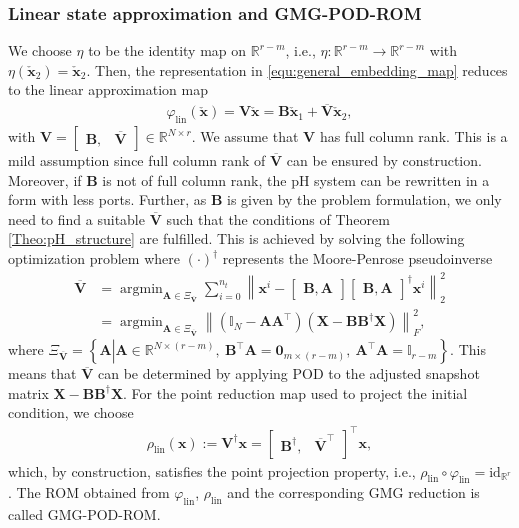 \documentclass{article}
\newcommand{\argmin}{ \mathop{ \mathrm{argmin} } }
\newcommand{\bmA}{\bm{A}}
\newcommand{\bmV}{\bm{V}}
\newcommand{\bmB}{\bm{B}}
\newcommand{\bmX}{\bm{X}}
\newcommand{\R}{\mathbb{R}}
\newcommand{\statex}{{\bm x}}
\newcommand{\stateRed}{\check{\bm x}}
\newcommand{\snapsize}{n_t}
\newcommand{\portsize}{m}
\newcommand{\FOMsize}{N}
\newcommand{\ROMsize}{r}
\newcommand{\Vbar}{\overline{\bmV}}
\newcommand{\approxfunc}{\varphi}
\newcommand{\VPODGMG}{\overline{\bmV}}
\newcommand{\pH}{\textsf{pH}\xspace}
\newcommand{\GMG}{\textsf{GMG}\xspace}
\newcommand{\POD}{\textsf{POD}\xspace}
\newcommand{\ROM}{\textsf{ROM}\xspace}
\begin{document}
\subsubsection{Linear state approximation and \GMG-\POD-\ROM} 
\label{Sec:GMGPODROM}
We choose $\eta$ to be the identity map on $\R^{r-m}$, i.e., $\eta: \R^{r-m} \rightarrow \R^{r-m}$ with $\eta(\stateRed_2)= \stateRed_2$. 
Then, the representation in \eqref{equ:general_embedding_map} reduces to the linear approximation map
								\begin{align}
									\label{equ:linear_approximation}
									\approxfunc_{\text{lin}}(\stateRed)=\bmV\stateRed =\bmB\stateRed_1+\VPODGMG\stateRed_2,
								\end{align}
								with $\bmV= 
								\begin{bmatrix}
									\bmB,&\VPODGMG
								\end{bmatrix}
\in \R^{\FOMsize \times \ROMsize}$. We assume that $\bmV$ has full column rank. This is a mild assumption since full column rank of $\VPODGMG$ can be ensured by construction. Moreover, if $\bmB$ is not of full column rank, the \pH system can be rewritten in a form with less ports. Further, as $\bmB$ is given by the problem formulation, we only need to find a suitable $\VPODGMG$ such that the conditions of Theorem \ref{Theo:pH_structure} are fulfilled. This is achieved by solving the following optimization problem where ${(\cdot)}^{\dagger}$ represents the Moore-Penrose pseudoinverse 
\begin{align*}
		\VPODGMG
		&=
		\argmin_{\bmA\in\Xi_{\VPODGMG}}
		\sum_{i=0}^{\snapsize}
		\left\| \statex^i-\begin{bmatrix}
			\bmB,\bmA
		\end{bmatrix}
		\begin{bmatrix}
			\bmB,\bmA
		\end{bmatrix}^{\dagger}\statex^i \right\|_2^2\\
		&=
		\argmin_{\bmA\in\Xi_{\VPODGMG}}
		\left\| 
		\left(\mathbb{I}_N-\bmA\bmA^{\top}\right)
		\left(\bmX-\bmB\bmB^{\dagger}\bmX\right)
		\right\|_F^2 ,
\end{align*}
where 
	$\Xi_{\VPODGMG} = \left\{\bmA\left|\right.\bmA\in\R^{\FOMsize\times(\ROMsize-\portsize)},
	\
	 \bmB^{\top} \bmA= \bm{0}_{\portsize \times (\ROMsize-\portsize)},
	 \
	 \bmA^{\top}\bmA=\mathbb{I}_{\ROMsize-\portsize}\right\}.$
This means that $\VPODGMG$ can be determined by applying \POD to the adjusted snapshot matrix $\bmX-\bmB\bmB^{\dagger}\bmX$.
For the point reduction map used to project the initial condition, we choose 
\begin{align}
	\rho_{\text{lin}}(\statex) := \bmV^{\dagger} \statex= 
	\begin{bmatrix}
		\bmB^{\dagger},&\Vbar^{\top}
	\end{bmatrix}^{\top} \statex,
\end{align}
which, by construction, satisfies the point projection property, i.e., $\rho_{\text{lin}} \circ \approxfunc_{\text{lin}} = \text{id}_{\R^{r}}$. The \ROM obtained from $\approxfunc_{\text{lin}}$, $\rho_{\text{lin}}$ and the corresponding \GMG reduction is called \GMG-\POD-\ROM. 
\end{document}
